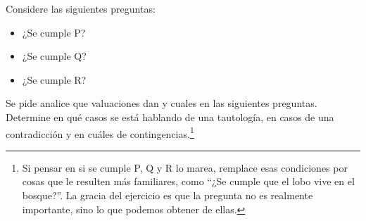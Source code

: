\documentclass[12pt, addpoints]{../../common/epyl_exam_template}
\begin{document}
\begin{questions}
  \jump
  \question
    Considere las siguientes preguntas:
    \begin{itemize}
      \item ¿Se cumple P?
      \item ¿Se cumple Q?
      \item ¿Se cumple R?
    \end{itemize}
    Se pide analice que valuaciones dan \fulltrue y cuales \fullfalse en las
    siguientes preguntas. Determine en qué casos se está hablando de una
    tautología, en casos de una contradicción y en cuáles de contingencias.\footnote{
      Si pensar en si se cumple P, Q y R lo marea, remplace esas condiciones por
      cosas que le resulten más familiares, como ``¿Se cumple que el lobo vive en el bosque?''.
      La gracia del ejercicio es que la pregunta no es realmente importante, sino
      lo que podemos obtener de ellas.
    }
\end{questions}
\end{document}

